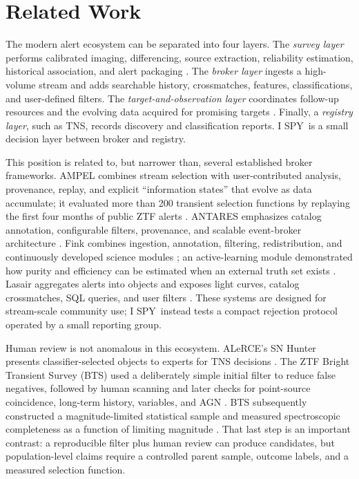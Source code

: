 \documentclass[11pt]{article}
\newcommand{\legacycampaign}{I SPY}
\begin{document}
\section{Related Work}
\label{sec:related}

The modern alert ecosystem can be separated into four layers. The \emph{survey layer} performs calibrated imaging, differencing, source extraction, reliability estimation, historical association, and alert packaging \citep{masci2019,patterson2019,duev2019}. The \emph{broker layer} ingests a high-volume stream and adds searchable history, crossmatches, features, classifications, and user-defined filters. The \emph{target-and-observation layer} coordinates follow-up resources and the evolving data acquired for promising targets \citep{street2018}. Finally, a \emph{registry layer}, such as TNS, records discovery and classification reports. \legacycampaign\ is a small decision layer between broker and registry.

This position is related to, but narrower than, several established broker frameworks. AMPEL combines stream selection with user-contributed analysis, provenance, replay, and explicit ``information states'' that evolve as data accumulate; it evaluated more than 200 transient selection functions by replaying the first four months of public ZTF alerts \citep{nordin2019}. ANTARES emphasizes catalog annotation, configurable filters, provenance, and scalable event-broker architecture \citep{matheson2021}. Fink combines ingestion, annotation, filtering, redistribution, and continuously developed science modules \citep{moller2021}; an active-learning module demonstrated how purity and efficiency can be estimated when an external truth set exists \citep{leoni2022}. Lasair aggregates alerts into objects and exposes light curves, catalog crossmatches, SQL queries, and user filters \citep{smith2019}. These systems are designed for stream-scale community use; \legacycampaign\ instead tests a compact rejection protocol operated by a small reporting group.

Human review is not anomalous in this ecosystem. ALeRCE's SN Hunter presents classifier-selected objects to experts for TNS decisions \citep{carrascodavis2021}. The ZTF Bright Transient Survey (BTS) used a deliberately simple initial filter to reduce false negatives, followed by human scanning and later checks for point-source coincidence, long-term history, variables, and AGN \citep{fremling2020}. BTS subsequently constructed a magnitude-limited statistical sample and measured spectroscopic completeness as a function of limiting magnitude \citep{perley2020}. That last step is an important contrast: a reproducible filter plus human review can produce candidates, but population-level claims require a controlled parent sample, outcome labels, and a measured selection function.
\end{document}
